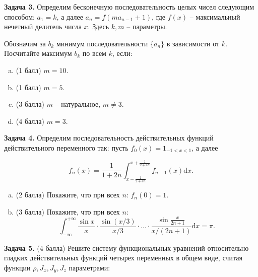 \documentclass[a4paper]{article}
\newcommand{\dd}{\mathrm{d}}
\begin{document}
	\textbf{Задача 3.} Определим бесконечную последовательность целых чисел следующим способом: $a_1 = k$, а далее $a_n = f(m a_{n-1} + 1)$, где $f(x)$ -- максимальный нечетный делитель числа $x$. Здесь $k, m$ -- параметры.

	Обозначим за $b_k$ минимум последовательности $\{a_n\}$ в зависимости от $k$. Посчитайте максимум $b_k$ по всем $k$, если:

	\begin{enumerate}[a)]
		\item (1 балл) $m = 10$.
		\item (1 балл) $m = 5$.
		\item (3 балла) $m$ -- натуральное, $m \ne 3$.
		\item (4 балла) $m = 3$.
	\end{enumerate}


	\textbf{Задача 4.} Определим последовательность действительных функций действительного переменного так: пусть $f_0(x) = \mathrm{1}_{-1 < x < 1}$, а далее

	\begin{equation*}
		f_n(x) = \frac{1}{1+2n} \int_{x - \frac{1}{2+4n}}^{x + \frac{1}{2+4n}} f_{n-1}(x) \dd x.
	\end{equation*}

	\begin{enumerate}[a)]
		\item (2 балла) Покажите, что при всех $n$: $f_n(0) = 1$.
		\item (3 балла) Покажите, что при всех $n$:
		\begin{equation*}
			\int_{-\infty}^{+\infty} \frac{\sin x}{x} \cdot \frac{\sin (x/3)}{x/3} \cdot \dots \cdot \frac{\sin \frac{x}{2n+1}}{x/(2n+1)} \dd x = \pi.
		\end{equation*}
	\end{enumerate}


	\textbf{Задача 5.} (4 балла) Решите систему функциональных уравнений относительно гладких действительных функций четырех переменных в общем виде, считая функции $\rho, J_x, J_y, J_z$ параметрами:
\end{document}

